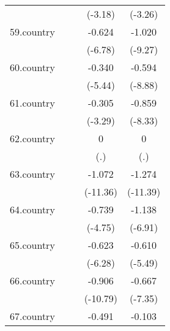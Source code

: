 {\begin{tabular}{l*{4}{c}}
            &                     &                     &     (-3.18)         &     (-3.26)         \\
[1em]
59.country  &                     &                     &      -0.624\sym{***}&      -1.020\sym{***}\\
            &                     &                     &     (-6.78)         &     (-9.27)         \\
[1em]
60.country  &                     &                     &      -0.340\sym{***}&      -0.594\sym{***}\\
            &                     &                     &     (-5.44)         &     (-8.88)         \\
[1em]
61.country  &                     &                     &      -0.305\sym{***}&      -0.859\sym{***}\\
            &                     &                     &     (-3.29)         &     (-8.33)         \\
[1em]
62.country  &                     &                     &           0         &           0         \\
            &                     &                     &         (.)         &         (.)         \\
[1em]
63.country  &                     &                     &      -1.072\sym{***}&      -1.274\sym{***}\\
            &                     &                     &    (-11.36)         &    (-11.39)         \\
[1em]
64.country  &                     &                     &      -0.739\sym{***}&      -1.138\sym{***}\\
            &                     &                     &     (-4.75)         &     (-6.91)         \\
[1em]
65.country  &                     &                     &      -0.623\sym{***}&      -0.610\sym{***}\\
            &                     &                     &     (-6.28)         &     (-5.49)         \\
[1em]
66.country  &                     &                     &      -0.906\sym{***}&      -0.667\sym{***}\\
            &                     &                     &    (-10.79)         &     (-7.35)         \\
[1em]
67.country  &                     &                     &      -0.491\sym{***}&      -0.103         \\

\end{tabular}}
